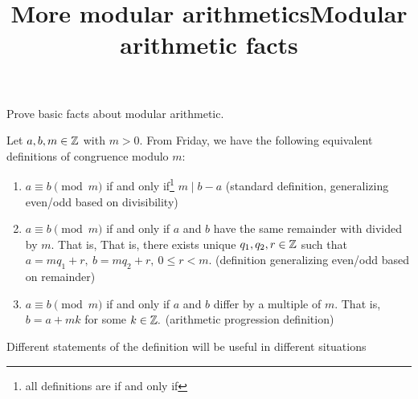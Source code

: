 \documentclass{ximera}
\title{More modular arithmetics}
\title{Modular arithmetic facts}
\begin{document}
\begin{abstract}
\end{abstract}
\maketitle


\begin{obj}
\item Prove basic facts about modular arithmetic.
\end{obj}

\begin{defn}\label{defn:mod-equiv-all}
Let $a,b,m\in\mathbb Z$ with $m>0.$ From Friday, we have the following equivalent definitions of congruence modulo $m:$
\begin{enumerate}
 \item $a\equiv b \pmod m$ if and only if\footnote{all definitions are if and only if} $m\mid b-a$ (standard definition, generalizing even/odd based on divisibility)
 \item $a\equiv b \pmod m$ if and only if $a$ and $b$ have the same remainder with divided by $m.$ That is, That is, there exists unique $q_1,q_2,r\in\mathbb Z$ such that  $a=mq_1+r,\   b=mq_2+r,\  0\leq r<m.$ (definition generalizing even/odd based on remainder)
\item $a\equiv b\pmod m$ if and only if $a$ and $b$ differ by a multiple of $m.$ That is, $b=a+mk$ for some $k\in\mathbb Z.$ (arithmetic progression definition)
\end{enumerate}
\end{defn}

Different statements of the definition will be useful in different situations
\end{document}
